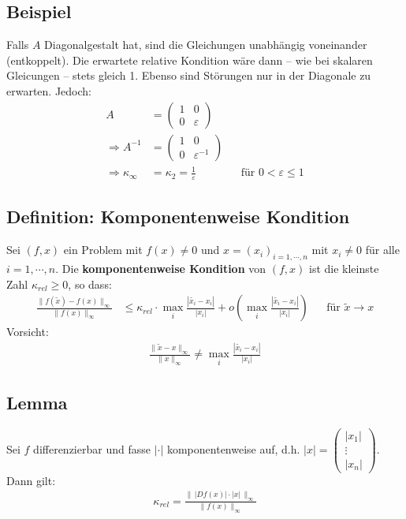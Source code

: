 \documentclass[ngerman,fontsize=11pt, paper=a4, parskip=half, titlepage=true, toc=bib]{scrbook}
\begin{document}
\subsection{Beispiel}
Falls $A$ Diagonalgestalt hat, sind die Gleichungen unabhängig voneinander (entkoppelt).
Die erwartete relative Kondition wäre dann -- wie bei skalaren Gleicungen -- stets gleich 1.
Ebenso sind Störungen nur in der Diagonale zu erwarten. Jedoch:
\begin{align*}
	A  &=\begin{pmatrix}
					1 & 0\\
					0 & \varepsilon
				\end{pmatrix} \\
	\Rightarrow 	A^{-1}&=\begin{pmatrix}
													1 & 0\\
													0 & \varepsilon^{-1}
												\end{pmatrix}\\
	\Rightarrow \kappa_\infty& = \kappa_2 = \frac{1}{\varepsilon} 
													&& \text{für }0 < \varepsilon \leq 1											
\end{align*}

\subsection{Definition: Komponentenweise Kondition}
Sei $(f, x) $ ein Problem mit $f(x)\neq 0$ und $x=(x_i)_{i=1,\cdots , n}$ mit $x_i\neq 0 $  für alle $i=1,\cdots, n$.
Die \textbf{komponentenweise Kondition} von $(f,x) $ ist die kleinste Zahl $\kappa_{rel}\geq 0$, so dass:
\begin{align*}
	\frac{\|f(\widetilde{x})-f(x)\|_\infty}{\|f(x)\|_\infty} 
				&\leq \kappa_{rel} \cdot \underset{i}{\max}\frac{|\widetilde{x_i}-x_i|}{|x_i|}+ o\left(\underset{i}{\max}\frac{|\widetilde{x_i}-x_i|}{|x_i|}\right) 
				&& \text{für }\widetilde{x}\rightarrow x
\end{align*}
Vorsicht:
\begin{gather*}
	\frac{\|\widetilde{x}-x\|_\infty}{\|x\|_\infty}\neq \underset{i}{\max}\frac{|\widetilde{x_i}-x_i|}{|x_i|}
\end{gather*}

\subsection{Lemma} \label{3.2.17}
Sei $f$ differenzierbar und fasse $|\cdot|$ komponentenweise auf, d.h. $|x| = \begin{pmatrix}
																																						|x_1| \\
																																						\vdots \\
																																						|x_n|
																																					\end{pmatrix}$.
Dann gilt:
\begin{gather}
	\kappa_{rel} = \frac{\|\, |Df(x)|\cdot |x| \, \|_\infty}{\|f(x)\|_\infty} \label{III.2.16}
\end{gather}
\end{document}
